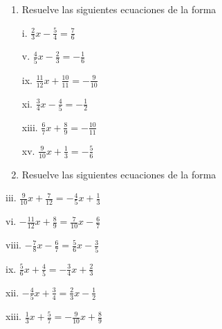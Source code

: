 \documentclass[]{book}
\providecommand{\tightlist}{%
  \setlength{\itemsep}{0pt}\setlength{\parskip}{0pt}}
\begin{document}
\begin{enumerate}
\def\labelenumi{\arabic{enumi}.}
\setcounter{enumi}{1}
\tightlist
\item
  Resuelve las siguientes ecuaciones de la forma

  \begin{multicols}{2}
  i. $\frac{2}{3}x - \frac{5}{4} = \frac{7}{6}$

  v. $\frac{4}{5}x - \frac{2}{3} = -\frac{1}{6}$

  ix. $\frac{11}{12}x + \frac{10}{11} = -\frac{9}{10}$

  xi. $\frac{3}{4}x - \frac{4}{5} = -\frac{1}{2}$

  xiii. $\frac{6}{7}x + \frac{8}{9} = -\frac{10}{11}$

  xv. $\frac{9}{10}x + \frac{1}{3} = -\frac{5}{6}$
  \end{multicols}
\item
  Resuelve las siguientes ecuaciones de la forma
\end{enumerate}

\begin{multicols}{2}
    iii. $\frac{9}{10}x + \frac{7}{12} = -\frac{4}{5}x + \frac{1}{3}$

    vi. $-\frac{11}{12}x + \frac{8}{9} = \frac{7}{10}x - \frac{6}{7}$

    viii. $-\frac{7}{8}x - \frac{6}{7} = \frac{5}{6}x - \frac{3}{5}$

    ix. $\frac{5}{6}x + \frac{4}{5} = -\frac{3}{4}x + \frac{2}{3}$

    xii. $-\frac{4}{5}x + \frac{3}{4} = \frac{2}{3}x - \frac{1}{2}$

    xiii. $\frac{1}{3}x + \frac{5}{7} = -\frac{9}{10}x + \frac{8}{9}$
\end{multicols}
\end{document}
